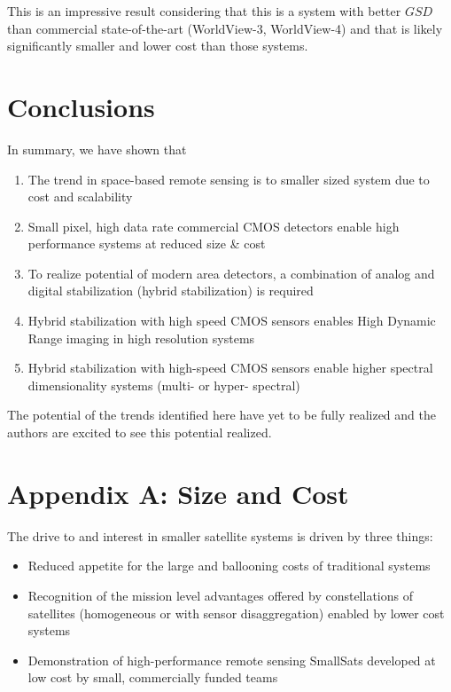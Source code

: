 \documentclass[]{spieman}  %
\begin{document}
This is an impressive result considering that this is a system with better $GSD$ than commercial state-of-the-art (WorldView-3, WorldView-4) and that is likely significantly smaller and lower cost than those systems.

\section{Conclusions}
\label{sec:conclusions}

In summary, we have shown that

\begin{enumerate}
    \item The trend in space-based remote sensing is to smaller sized system due to cost and scalability
    \item Small pixel, high data rate commercial CMOS detectors enable high performance systems at reduced size \& cost
    \item To realize potential of modern area detectors, a combination of analog and digital stabilization (hybrid stabilization) is required
    \item Hybrid stabilization with high speed CMOS sensors enables High Dynamic Range imaging in high resolution systems
    \item Hybrid stabilization with high-speed CMOS sensors enable higher spectral dimensionality systems (multi- or hyper- spectral)
\end{enumerate}

The potential of the trends identified here have yet to be fully realized and the authors are excited to see this potential realized.

\section{Appendix A: Size and Cost}
\label{sec:appendix_a}
The drive to and interest in smaller satellite systems is driven by three things:
\begin{itemize}
    \item Reduced appetite for the large and ballooning costs of traditional systems
    \item Recognition of the mission level advantages offered by constellations of satellites (homogeneous or with sensor disaggregation) enabled by lower cost systems
    \item Demonstration of high-performance remote sensing SmallSats developed at low cost by small, commercially funded teams
\end{itemize} 
\end{document}
